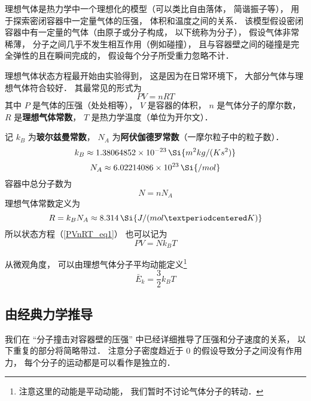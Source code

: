

理想气体是热力学中一个理想化的模型（可以类比自由落体， 简谐振子等）， 用于探索密闭容器中一定量气体的压强， 体积和温度之间的关系． 该模型假设密闭容器中有一定量的气体（由原子或分子构成， 以下统称为分子）， 假设气体非常稀薄， 分子之间几乎不发生相互作用（例如碰撞）， 且与容器壁之间的碰撞是完全弹性的且在瞬间完成的， 假设每个分子所受重力忽略不计．

理想气体状态方程最开始由实验得到， 这是因为在日常环境下， 大部分气体与理想气体符合较好． 其最常见的形式为
\begin{equation}\label{PVnRT_eq1}
PV = nRT
\end{equation}
其中 $P$ 是气体的压强（处处相等）， $V$ 是容器的体积， $n$ 是气体分子的摩尔数， $R$ 是\textbf{理想气体常数}， $T$ 是热力学温度（单位为开尔文）．

记 $k_B$ 为\textbf{玻尔兹曼常数}， $N_A$ 为\textbf{阿伏伽德罗常数}（一摩尔粒子中的粒子数）．
\begin{equation}
k_B \approx 1.38064852 \times 10^{-23} \,\Si{m^2 kg / (K s^2)}
\end{equation}
\begin{equation}
N_A \approx 6.02214086 \times 10^{23} \,\Si{/mol}
\end{equation}
容器中总分子数为
\begin{equation}
N = n N_A
\end{equation}
理想气体常数定义为
\begin{equation}\label{PVnRT_eq2}
R = k_B N_A \approx 8.314 \,\Si{J / (mol · K)}
\end{equation}
所以状态方程（\autoref{PVnRT_eq1}） 也可以记为
\begin{equation}\label{PVnRT_eq4}
PV = N k_B T
\end{equation}

从微观角度，  可以由理想气体分子平均动能定义\footnote{注意这里的动能是平动动能， 我们暂时不讨论气体分子的转动．}
\begin{equation}\label{PVnRT_eq3}
\bar E_k = \frac32 k_B T
\end{equation}

\subsection{由经典力学推导}

我们在 “分子撞击对容器壁的压强” 中已经详细推导了压强和分子速度的关系， 以下重复的部分将简略带过． 注意分子密度趋近于 0 的假设导致分子之间没有作用力， 每个分子的运动都是可以看作是独立的．

